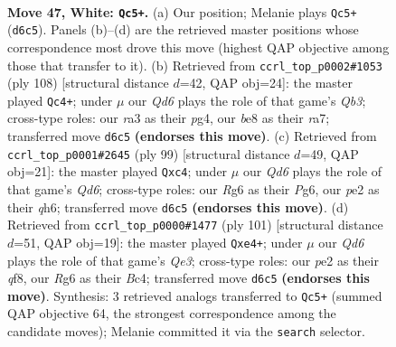 \documentclass[11pt]{article}
\begin{document}
\clearpage

\begin{figure}[p]\centering
\begin{subfigure}{0.46\textwidth}\centering
\resizebox{\linewidth}{!}{%
\newchessgame
\chessboard[
  setfen={2k1b3/8/3Q2R1/3P4/8/r5p1/P1P1p1P1/4K3 w - - 3 47},
  showmover=false,
  pgfstyle=straightmove, color=movearrow, markmove={d6-c5}
]}
\caption{}
\end{subfigure}\hfill
\begin{subfigure}{0.46\textwidth}\centering
\resizebox{\linewidth}{!}{%
\newchessgame
\chessboard[
  setfen={4r3/rPb5/2k5/8/6p1/1QP1p2P/4K3/8 w - - 0 55},
  showmover=false,
  pgfstyle=straightmove, color=movearrow, markmove={b3-c4}
]}
\caption{}
\end{subfigure}
\\[4pt]
\begin{subfigure}{0.46\textwidth}\centering
\resizebox{\linewidth}{!}{%
\newchessgame
\chessboard[
  setfen={8/5k2/6pQ/4p2p/p1R5/P1Pq3P/6K1/8 b - - 4 50},
  showmover=false,
  pgfstyle=straightmove, color=movearrow, markmove={d3-c4}
]}
\caption{}
\end{subfigure}\hfill
\begin{subfigure}{0.46\textwidth}\centering
\resizebox{\linewidth}{!}{%
\newchessgame
\chessboard[
  setfen={5Q2/7p/4q1k1/2p5/p1b1P3/2R4P/6K1/8 b - - 0 51},
  showmover=false,
  pgfstyle=straightmove, color=movearrow, markmove={e6-e4}
]}
\caption{}
\end{subfigure}
\caption{\textbf{Move 47, White: \texttt{Qc5+}.} (a) Our position; Melanie plays \texttt{Qc5+} (\texttt{d6c5}). Panels (b)--(d) are the retrieved master positions whose correspondence most drove this move (highest QAP objective among those that transfer to it). (b) Retrieved from \texttt{ccrl\_top\_p0002\#1053} (ply 108) [structural distance $d$=42, QAP obj=24]: the master played \texttt{Qc4+}; under $\mu$ our \emph{Qd6} plays the role of that game's \emph{Qb3}; cross-type roles: our \emph{r}a3 as their \emph{p}g4, our \emph{b}e8 as their \emph{r}a7; transferred move \texttt{d6c5} \textbf{(endorses this move)}. (c) Retrieved from \texttt{ccrl\_top\_p0001\#2645} (ply 99) [structural distance $d$=49, QAP obj=21]: the master played \texttt{Qxc4}; under $\mu$ our \emph{Qd6} plays the role of that game's \emph{Qd6}; cross-type roles: our \emph{R}g6 as their \emph{P}g6, our \emph{p}e2 as their \emph{q}h6; transferred move \texttt{d6c5} \textbf{(endorses this move)}. (d) Retrieved from \texttt{ccrl\_top\_p0000\#1477} (ply 101) [structural distance $d$=51, QAP obj=19]: the master played \texttt{Qxe4+}; under $\mu$ our \emph{Qd6} plays the role of that game's \emph{Qe3}; cross-type roles: our \emph{p}e2 as their \emph{q}f8, our \emph{R}g6 as their \emph{B}c4; transferred move \texttt{d6c5} \textbf{(endorses this move)}. Synthesis: 3 retrieved analogs transferred to \texttt{Qc5+} (summed QAP objective 64, the strongest correspondence among the candidate moves); Melanie committed it via the \texttt{search} selector.}
\label{fig:thought-m92}
\end{figure}
\end{document}
